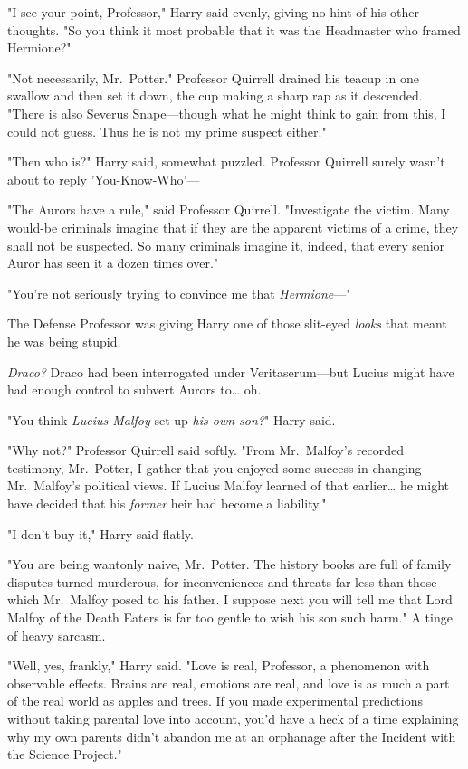 "I see your point, Professor," Harry said evenly, giving no hint of his other thoughts. "So you think it most probable that it was the Headmaster who framed Hermione?"

"Not necessarily, Mr.~Potter." Professor Quirrell drained his teacup in one swallow and then set it down, the cup making a sharp rap as it descended. "There is also Severus Snape---though what he might think to gain from this, I could not guess. Thus he is not my prime suspect either."

"Then who is?" Harry said, somewhat puzzled. Professor Quirrell surely wasn't about to reply 'You-Know-Who'---

"The Aurors have a rule," said Professor Quirrell. "Investigate the victim. Many would-be criminals imagine that if they are the apparent victims of a crime, they shall not be suspected. So many criminals imagine it, indeed, that every senior Auror has seen it a dozen times over."

"You're not seriously trying to convince me that \emph{Hermione}---"

The Defense Professor was giving Harry one of those slit-eyed \emph{looks} that meant he was being stupid.

\emph{Draco?} Draco had been interrogated under Veritaserum---but Lucius might have had enough control to subvert Aurors to{\ldots} oh.

"You think \emph{Lucius Malfoy} set up \emph{his own son?}" Harry said.

"Why not?" Professor Quirrell said softly. "From Mr.~Malfoy's recorded testimony, Mr.~Potter, I gather that you enjoyed some success in changing Mr.~Malfoy's political views. If Lucius Malfoy learned of that earlier{\ldots} he might have decided that his \emph{former} heir had become a liability."

"I don't buy it," Harry said flatly.

"You are being wantonly naive, Mr.~Potter. The history books are full of family disputes turned murderous, for inconveniences and threats far less than those which Mr.~Malfoy posed to his father. I suppose next you will tell me that Lord Malfoy of the Death Eaters is far too gentle to wish his son such harm." A tinge of heavy sarcasm.

"Well, yes, frankly," Harry said. "Love is real, Professor, a phenomenon with observable effects. Brains are real, emotions are real, and love is as much a part of the real world as apples and trees. If you made experimental predictions without taking parental love into account, you'd have a heck of a time explaining why my own parents didn't abandon me at an orphanage after the Incident with the Science Project."

